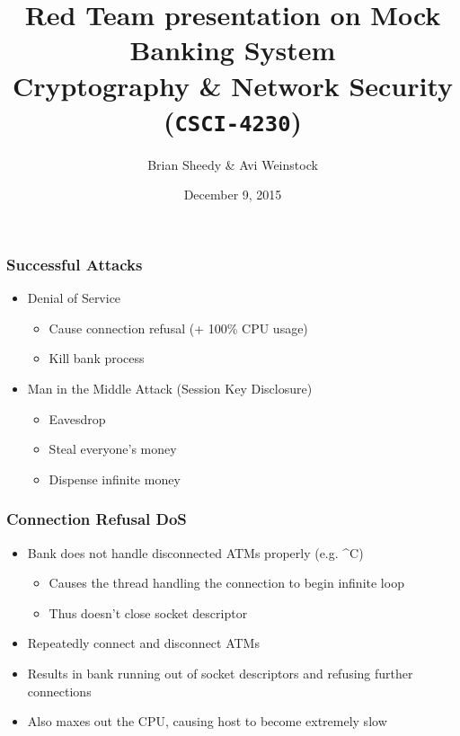 \documentclass{beamer}
\title{Red Team presentation on Mock Banking System\\Cryptography \& Network Security (\Verb|CSCI-4230|)}
\date{December 9, 2015}
\author{Brian Sheedy \& Avi Weinstock}
\begin{document}
\maketitle

\begin{frame}[fragile]
\frametitle{Successful Attacks}
\begin{itemize}
\item Denial of Service
\begin{itemize}
\item Cause connection refusal (+ 100\% CPU usage)
\item Kill bank process
\end{itemize}
\item Man in the Middle Attack (Session Key Disclosure)
\begin{itemize}
\item Eavesdrop
\item Steal everyone's money
\item Dispense infinite money
\end{itemize}
\end{itemize}
\end{frame}

\begin{frame}[fragile]
\frametitle{Connection Refusal DoS}
\begin{itemize}
\item Bank does not handle disconnected ATMs properly (e.g. \^{}C)
\begin{itemize}
\item Causes the thread handling the connection to begin infinite loop
\item Thus doesn't close socket descriptor
\end{itemize}
\item Repeatedly connect and disconnect ATMs
\item Results in bank running out of socket descriptors and refusing further connections
\item Also maxes out the CPU, causing host to become extremely slow
\end{itemize}
\end{frame}
\end{document}
